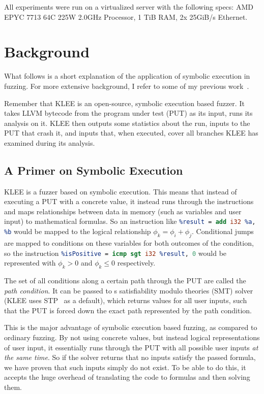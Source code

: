 \documentclass{article}
\let\savedCite=\cite
\renewcommand{\cite}{\unskip~\savedCite}
\begin{document}
\begin{multicols}{2}
    All experiments were run on a virtualized server with the following specs: AMD EPYC 7713 64C 225W 2.0GHz Processor, 1 TiB RAM, 2x 25GiB/s Ethernet.
    \section{Background}

    What follows is a short explanation of the application of symbolic execution in fuzzing. For more extensive background, I refer to some of my previous work\cite{EVA, BA}.

    Remember that KLEE is an open-source, symbolic execution based fuzzer. It takes LLVM bytecode from the program under test (PUT) as its input, runs its analysis on it. KLEE then outputs some statistics about the run, inputs to the PUT that crash it, and inputs that, when executed, cover all branches KLEE has examined during its analysis.

    \subsection{A Primer on Symbolic Execution}
    KLEE is a fuzzer based on symbolic execution. This means that instead of executing a PUT with a concrete value, it instead runs through the instructions and maps relationships between data in memory (such as variables and user input) to mathematical formulas. So an instruction like \lstinline[language=llvm]{%result = add i32 %a, %b} would be mapped to the logical relationship $\phi_k=\phi_i+\phi_j$. Conditional jumps are mapped to conditions on these variables for both outcomes of the condition, so the instruction \lstinline[language=llvm]{%isPositive = icmp sgt i32 %result, 0} would be represented with $\phi_k>0$ and $\phi_k\le0$ respectively.

    The set of all conditions along a certain path through the PUT are called the \textit{path condition}. It can be passed to s satisfiability modulo theories (SMT) solver (KLEE uses STP\cite{STP} as a default), which returns values for all user inputs, such that the PUT is forced down the exact path represented by the path condition.

    This is the major advantage of symbolic execution based fuzzing, as compared to ordinary fuzzing. By not using concrete values, but instead logical representations of user input, it essentially runs through the PUT with all possible user inputs \textit{at the same time}. So if the solver returns that no inputs satisfy the passed formula, we have proven that such inputs simply do not exist. To be able to do this, it accepts the huge overhead of translating the code to formulas and then solving them.


\end{multicols}
\end{document}
